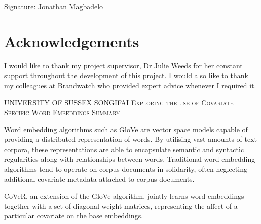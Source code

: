 \documentclass[a4paper,11pt]{report}
\newcommand{\linespacing}{1.5}
\renewcommand{\baselinestretch}{\linespacing}
\begin{document}
\vskip5mm
Signature:
\vskip20mm
Jonathan Magbadelo

\chapter*{Acknowledgements}
\renewcommand{\baselinestretch}{\linespacing}
\small\normalsize
I would like to thank my project supervisor, Dr Julie Weeds for her constant support throughout the development of this project. I would also like to thank my colleagues at Brandwatch who provided expert advice whenever I required it.

\thispagestyle{empty}
\newpage
\null\vskip10mm
\begin{center}
\large
\underline{UNIVERSITY OF SUSSEX}
\vskip20mm
\vskip20mm
\underline{\textsc{SONGIFAI}}
\vskip0mm
\textsc{Exploring the use of Covariate Specific Word Embeddings}
\vskip15mm
\underline{\textsc{Summary}}
\vskip2mm
\end{center}
\renewcommand{\baselinestretch}{1.0}
\small\normalsize
Word embedding algorithms such as GloVe are vector space models capable of providing a distributed representation of words. By utilising vast amounts of text corpora, these representations are able to encapsulate semantic and syntactic regularities along with relationships between words. Traditional word embedding algorithms tend to operate on corpus documents in solidarity, often neglecting additional covariate metadata attached to corpus documents. 

\noindent
\newline
CoVeR, an extension of the GloVe algorithm, jointly learns word embeddings together with a set of diagonal weight matrices, representing the affect of a particular covariate on the base embeddings.
\end{document}
